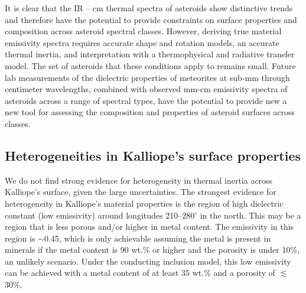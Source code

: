 \documentclass[]{aastex631}
\begin{document}
It is clear that the IR -- cm thermal spectra of asteroids show distinctive trends and therefore have the potential to provide constraints on surface properties and composition across asteroid spectral classes. However, deriving true material emissivity spectra requires accurate shape and rotation models, an accurate thermal inertia, and interpretation with a thermophysical and radiative transfer model. The set of asteroids that these conditions apply to remains small. Future lab measurements of the dielectric properties of meteorites at sub-mm through centimeter wavelengths, combined with observed mm-cm emissivity spectra of asteroids across a range of spectral types, have the potential to provide new a new tool for assessing the composition and properties of asteroid surfaces across classes.

\subsection{Heterogeneities in Kalliope's surface properties}

We do not find strong evidence for heterogeneity in thermal inertia across Kalliope's surface, given the large uncertainties. The strongest evidence for heterogeneity in Kalliope's material properties is the region of high dielectric constant (low emissivity) around longitudes 210--280$^{\circ}$ in the north. This may be a region that is less porous and/or higher in metal content. The emissivity in this region is $\sim$0.45, which is only achievable assuming the metal is present in minerals if the metal content is 90 wt.\% or higher and the porosity is under 10\%, an unlikely scenario. Under the conducting inclusion model, this low emissivity can be achieved with a metal content of at least 35 wt.\% and a porosity of $\lesssim$30\%. 
\end{document}
